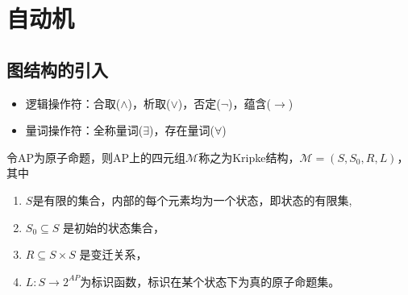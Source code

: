 \chapter{自动机}

\vspace{-5pt}
\begin{center}
\end{center}
\section{图结构的引入}
\begin{definition}[一阶逻辑公式]
\begin{itemize}
    \item 逻辑操作符：合取($\wedge $)，析取($\vee$)，否定($\neg$)，蕴含($\rightarrow$)
    \item 量词操作符：全称量词($\exists$)，存在量词($\forall$)
\end{itemize}
\end{definition}
\begin{definition}
令AP为原子命题，则AP上的四元组$\mathcal{M}$称之为Kripke结构，$\mathcal{M}=\left(S,S_0,R,L\right)$，其中
\begin{enumerate}
    \item $S$是有限的集合，内部的每个元素均为一个状态，即状态的有限集,
    \item $S_0 \subseteq S$ 是初始的状态集合，
    \item $R \subseteq S \times S$ 是变迁关系，
    \item $L: S \rightarrow 2^{AP}$为标识函数，标识在某个状态下为真的原子命题集。
\end{enumerate}
\end{definition}

